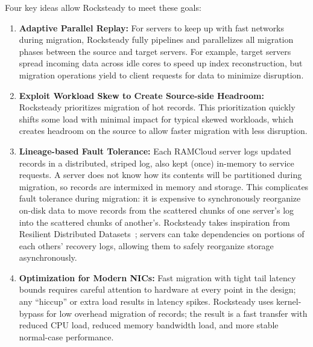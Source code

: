 Four key ideas allow Rocksteady to meet these goals:
\begin{enumerate}
\item {\bf Adaptive Parallel Replay:}
For servers to keep up with fast networks during migration, Rocksteady fully
pipelines and parallelizes all migration phases between the source and
target servers. For example, target servers spread incoming data across idle
cores to speed up index reconstruction, but migration operations yield to
client requests for data to minimize disruption.

\item {\bf Exploit Workload Skew to Create Source-side Headroom:} Rocksteady
  prioritizes migration of hot records. This prioritization
  quickly shifts some load with minimal impact for typical skewed
  workloads, which creates headroom on the
  source to allow faster migration with less disruption.

\item {\bf Lineage-based Fault Tolerance:}
Each RAMCloud server logs updated records in a distributed, striped log,
also kept (once) in-memory to service requests. A server does not know how its
contents will be partitioned during migration, so records are intermixed
in memory and storage. This complicates fault tolerance during
migration: it is expensive to synchronously reorganize on-disk data to move
records from the scattered chunks of one server's log into the scattered chunks
of another's.  Rocksteady takes inspiration from
Resilient Distributed Datasets~\cite{spark}; servers can take dependencies
on portions of each others' recovery logs, allowing them to safely
reorganize storage asynchronously.

\item {\bf Optimization for Modern NICs:}
Fast migration with tight tail latency bounds requires careful attention to
hardware at every point in the design; any ``hiccup'' or extra load results in
latency spikes.
Rocksteady uses kernel-bypass for low overhead
migration of records;
the result is a fast
transfer with reduced CPU load, reduced memory bandwidth load, and more
stable normal-case performance.

\end{enumerate}

